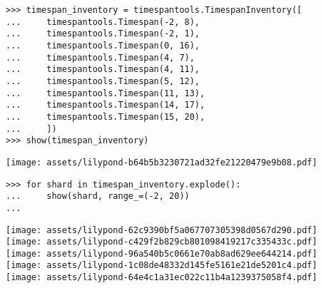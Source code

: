 \begin{comment}
<abjad>
timespan_inventory = timespantools.TimespanInventory([
    timespantools.Timespan(-2, 8),
    timespantools.Timespan(-2, 1),
    timespantools.Timespan(0, 16),
    timespantools.Timespan(4, 7),
    timespantools.Timespan(4, 11),
    timespantools.Timespan(5, 12),
    timespantools.Timespan(11, 13),
    timespantools.Timespan(14, 17),
    timespantools.Timespan(15, 20),
    ])
show(timespan_inventory)
for shard in timespan_inventory.explode():
    show(shard, range_=(-2, 20))

</abjad>
\end{comment}

\begin{abjadbookoutput}
\begin{singlespacing}
\vspace{-0.5\baselineskip}
\begin{verbatim}
>>> timespan_inventory = timespantools.TimespanInventory([
...     timespantools.Timespan(-2, 8),
...     timespantools.Timespan(-2, 1),
...     timespantools.Timespan(0, 16),
...     timespantools.Timespan(4, 7),
...     timespantools.Timespan(4, 11),
...     timespantools.Timespan(5, 12),
...     timespantools.Timespan(11, 13),
...     timespantools.Timespan(14, 17),
...     timespantools.Timespan(15, 20),
...     ])
>>> show(timespan_inventory)
\end{verbatim}
\noindent\texttt{[image: assets/lilypond-b64b5b3230721ad32fe21220479e9b08.pdf]}
\begin{verbatim}
>>> for shard in timespan_inventory.explode():
...     show(shard, range_=(-2, 20))
...
\end{verbatim}
\noindent\texttt{[image: assets/lilypond-62c9390bf5a067707305398d0567d290.pdf]}\\
\noindent\texttt{[image: assets/lilypond-c429f2b829cb801098419217c335433c.pdf]}\\
\noindent\texttt{[image: assets/lilypond-96a540b5c0661e70ab8ad629ee644214.pdf]}\\
\noindent\texttt{[image: assets/lilypond-1c08de48332d145fe5161e21de5201c4.pdf]}\\
\noindent\texttt{[image: assets/lilypond-64e4c1a31ec022c11b4a1239375058f4.pdf]}
\end{singlespacing}
\end{abjadbookoutput}

